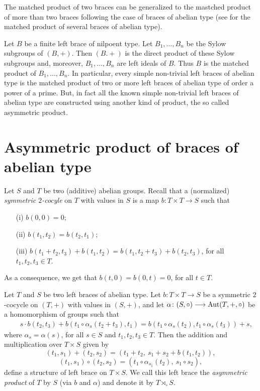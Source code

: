 The matched product of two braces can be generalized to the mastched product of more than two braces following the case of braces of abelian type (see \cite{MR3812099} for the matched product of several braces of abelian type). 

Let $B$ be a finite left brace of nilpoent type. Let $B_1,\dots ,B_n$ be the Sylow subgroups of $(B,+)$. Then $(B.+)$ is the direct product of these Sylow subgroups and, moreover, $B_1,\dots ,B_n$ are left ideals of $B$. Thus $B$ is the matched product of $B_1,\dots ,B_n$. In particular, every simple non-trivial left braces of abelian type is the matched product of two or more left braces of abelian type of order a power of a prime. But, in fact all the known simple non-trivial left braces of abelian type are constructed using another kind of product, the so called asymmetric product.

\section*{Asymmetric product of braces of abelian type}

Let $S$ and $T$ be two (additive) abelian groups. Recall that a (normalized)
\emph{symmetric $2$-cocyle}  on $T$ with values in $S$ is a map $b\colon
T\times T\longrightarrow S$ such that
\begin{enumerate}
	\item[(i)]\label{cond0} $b(0,0)=0$;
	\item[(ii)]\label{cond1} $b(t_1,t_2)=b(t_2,t_1)$;
	\item[(iii)]\label{cond2} $b(t_1+t_2,t_3)+b(t_1,t_2)=b(t_1,t_2+t_3)+b(t_2,t_3)$, for all $t_1,t_2,t_3\in T$.
\end{enumerate}
As a consequence, we get that $b(t,0)=b(0,t)=0$, for all $t\in T$.

\begin{theorem}\label{ccs}
	Let $T$ and $S$ be two left braces of abelian type. Let $b \colon T\times T
	\longrightarrow S$ be a symmetric $2$-cocycle on $(T, +)$ with
	values in $(S, +)$, and let $\alpha \colon (S,\circ)\longrightarrow
	\operatorname{Aut}(T,+,\circ)$ be a homomorphism of groups such that
	\begin{eqnarray}\label{cond3} && s\cdot b(t_2, t_3) + b(t_1\circ \alpha_s(t_2 + t_3),t_1)=
		b(t_1\circ\alpha_s(t_2), t_1\circ\alpha_s(t_3))+ s,\end{eqnarray}
	where $\alpha_s=\alpha(s)$, for all $s\in S$ and $t_1, t_2, t_3\in T$. Then the addition and
	multiplication over $T\times S$ given by
	$$
	(t_1,s_1)+(t_2,s_2)=(t_1+t_2,~s_1+s_2+b(t_1,t_2)),
	$$
	$$
	(t_1,s_1)\circ (t_2,s_2)=(t_1\circ \alpha_{s_1}(t_2),~s_1\circ s_2),
	$$
	define a structure of left brace on $T\times S$. We call this left
	brace the \emph{asymmetric product}  of $T$ by $S$ (via $b$ and $\alpha$)
	and denote it by  $T\rtimes_\circ S$.
\end{theorem}

